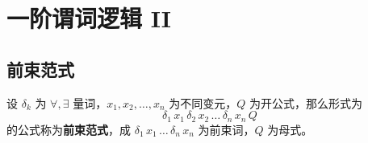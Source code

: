 \section{一阶谓词逻辑 II}

\subsection{前束范式}

\begin{definition}[前束范式]
	设 $\delta_k$ 为 $\forall, \exists$ 量词，$x_1, x_2, \dots, x_n$ 为不同变元，$Q$ 为开公式，那么形式为
	$$
	\delta_1\, x_1\, \delta_2\, x_2\, \dots\, \delta_n\, x_n\, Q
	$$
	的公式称为\textbf{前束范式}，成 $\delta_1\, x_1\, \dots\, \delta_n\, x_n$ 为前束词，$Q$ 为母式。
\end{definition}